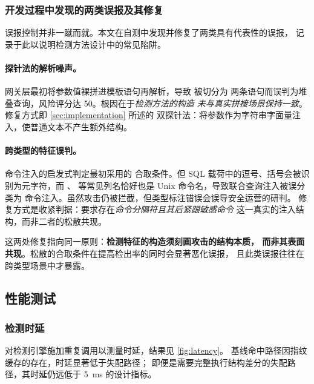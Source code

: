 \subsubsection{开发过程中发现的两类误报及其修复}

误报控制并非一蹴而就。本文在自测中发现并修复了两类具有代表性的误报，
记录于此以说明检测方法设计中的常见陷阱。

\paragraph{探针法的解析噪声。}
网关层最初将参数值裸拼进模板语句再解析，导致  被切分为
两条语句而误判为堆叠查询，风险评分达 50。根因在于\emph{检测方法的构造
未与真实拼接场景保持一致}。修复方式即 \cref{sec:implementation} 所述的
双探针法：将参数作为字符串字面量注入，使普通文本不产生额外结构。

\paragraph{跨类型的特征误判。}
命令注入的启发式判定最初采用的
合取条件。但 SQL 载荷中的逗号、括号会被识别为元字符，而 、
 等常见列名恰好也是 Unix 命令名，导致联合查询注入被误分类为
命令注入。虽然攻击仍被拦截，但类型标注错误会误导安全运营的研判。
修复方式是收紧判据：要求存在\emph{命令分隔符且其后紧跟敏感命令}
这一真实的注入结构，而非二者的松散共现。

\begin{keybox}
这两处修复指向同一原则：\textbf{检测特征的构造须刻画攻击的结构本质，
而非其表面共现}。松散的合取条件在提高检出率的同时会显著恶化误报，
且此类误报往往在跨类型场景中才暴露。
\end{keybox}

\subsection{性能测试}

\subsubsection{检测时延}

对检测引擎施加重复调用以测量时延，结果见 \cref{fig:latency}。
基线命中路径因指纹缓存的存在，时延显著低于失配路径；
即便是需要完整执行结构差分的失配路径，其时延仍远低于 5~ms 的设计指标。


